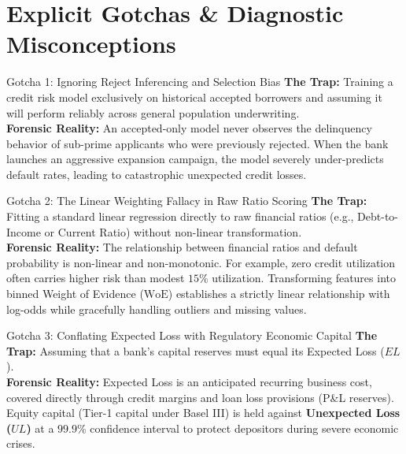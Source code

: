 \section{Explicit Gotchas \& Diagnostic Misconceptions}

\begin{trapbox}{Gotcha 1: Ignoring Reject Inferencing and Selection Bias}
\textbf{The Trap:} Training a credit risk model exclusively on historical accepted borrowers and assuming it will perform reliably across general population underwriting.\\
\textbf{Forensic Reality:} An accepted-only model never observes the delinquency behavior of sub-prime applicants who were previously rejected. When the bank launches an aggressive expansion campaign, the model severely under-predicts default rates, leading to catastrophic unexpected credit losses.
\end{trapbox}

\begin{trapbox}{Gotcha 2: The Linear Weighting Fallacy in Raw Ratio Scoring}
\textbf{The Trap:} Fitting a standard linear regression directly to raw financial ratios (e.g., Debt-to-Income or Current Ratio) without non-linear transformation.\\
\textbf{Forensic Reality:} The relationship between financial ratios and default probability is non-linear and non-monotonic. For example, zero credit utilization often carries higher risk than modest $15\%$ utilization. Transforming features into binned Weight of Evidence ($\text{WoE}$) establishes a strictly linear relationship with log-odds while gracefully handling outliers and missing values.
\end{trapbox}

\begin{trapbox}{Gotcha 3: Conflating Expected Loss with Regulatory Economic Capital}
\textbf{The Trap:} Assuming that a bank's capital reserves must equal its Expected Loss ($EL$).\\
\textbf{Forensic Reality:} Expected Loss is an anticipated recurring business cost, covered directly through credit margins and loan loss provisions (P\&L reserves). Equity capital (Tier-1 capital under Basel III) is held against \textbf{Unexpected Loss ($UL$)} at a $99.9\%$ confidence interval to protect depositors during severe economic crises.
\end{trapbox}

